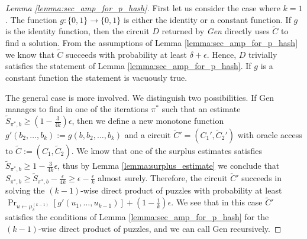 \begin{proof}[Lemma \ref{lemma:sec_amp_for_p_hash}]
First let us consider the case where $k=1$. The function $g: \{0,1\} \rightarrow \{0,1\}$ is either the identity or a constant function.
If $g$ is the identity function, then the circuit $D$ returned by \textit{Gen} directly uses $\widetilde{C}$ to find a solution.
From the assumptions of Lemma \ref{lemma:sec_amp_for_p_hash} we know that $\widetilde{C}$ succeeds with probability at least
$\delta + \epsilon$. Hence, $D$ trivially satisfies the statement of Lemma \ref{lemma:sec_amp_for_p_hash}.
If $g$ is a constant function the statement is vacuously true.

The general case is more involved. We distinguish two possibilities.
If Gen manages to find in one of the iterations $\pi^*$ such that an estimate
$\widetilde{S}_{\pi^*,b} \geq (1-\frac{3}{4k})\epsilon$, then we define a new monotone function
$g'(b_2, \dots, b_k) := g(b, b_2, \dots, b_k)$ and a circuit $\widetilde{C}' = (C_1', \widetilde{C}_2')$ with oracle access to $\widetilde{C} := (C_1, \widetilde{C}_2)$.
We know that one of the surplus estimates satisfies $\widetilde{S}_{\pi^*, b} \geq 1 - \frac{3}{4k}\epsilon$, thus by Lemma \ref{lemma:surplus_estimate}
we conclude that $S_{\pi^*,b} \geq \widetilde{S}_{\pi^*, b} - \frac{\epsilon}{4k} \geq \epsilon - \frac{\epsilon}{k}$ almost surely.
Therefore, the circuit $\widetilde{C}'$ succeeds in solving the $(k-1)$-wise direct product of puzzles with probability
at least $\Pr_{u \leftarrow \mu^{(k-1)}_{\delta}}[g'(u_1,\dots, u_{k-1} )] + (1 - \frac{1}{k})\epsilon$.
We see that in this case $\widetilde{C}'$ satisfies the conditions of Lemma \ref{lemma:sec_amp_for_p_hash}
for the $(k-1)$-wise direct product of puzzles, and we can call Gen recursively.


\end{proof}
